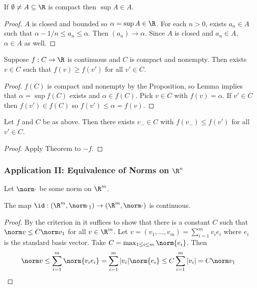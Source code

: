 \documentclass[a4paper]{article}
\theoremstyle{definition}
\begin{document}
\begin{lemma}
  If \(\emptyset \neq A \subseteq \R \) is compact then \(\sup A \in A\).
\end{lemma}

\begin{proof}
  \(A\) is closed and bounded so \(\alpha = \sup A\in \R\). For each \(n>0\), exists \(a_n \in A\) such that \(\alpha-1/n \leq a_n \leq \alpha\). Then \((a_n)\to \alpha\). Since \(A\) is closed and \(a_n \in A\), \(\alpha\in A\) as well.
\end{proof}
 
\begin{theorem}
  Suppose \(f:C\to \R\)  is continuous and \(C\) is compact and nonempty. Then exists \(v\in C\) such that \(f(v) \geq f(v')\) for all \(v' \in C\).
\end{theorem}

\begin{proof}
  \(f(C)\) is compact and nonempty by the Proposition, so Lemma implies that \(\alpha = \sup f(C)\) exists and \(\alpha\in f(C)\). Pick \(v\in C\) with \(f(v) = \alpha\). If \(v'\in C\) then \(f(v') \in f(C)\) so \(f(v') \leq \alpha = f(v)\).
\end{proof}

\begin{corollary}
  Let \(f\) and \(C\) be as above. Then there exists \(v_-\in C\) with \(f(v_-) \leq f(v')\) for all \(v' \in C\).
\end{corollary}

\begin{proof}
  Apply Theorem to \(-f\).
\end{proof}

\subsubsection{Application II: Equivalence of Norms on \texorpdfstring{\(\R^n\)}{R\^{}n}}

Let \(\norm \cdot\) be some norm on \(\R^m\).
  
\begin{lemma}
  The map \(\id: (\R^m, \norm \cdot_1) \to (\R^m, \norm \cdot)\) is continuous.
\end{lemma}

\begin{proof}
  By the criterion in  it suffices to show that there is a constant \(C\) such that \(\norm v \leq C \norm v_1\) for all \(v\in \R^m\). Let \(v = (v_1,\dots,v_m) = \sum_{i=1}^{m}v_ie_i \) where \(e_i\) is the standard basis vector. Take \(C = \max_{1\leq i\leq m}\norm{e_i}\). Then
  \[
    \norm v \leq \sum_{i=1}^{m}\norm{v_ie_i} = \sum_{i=1}^{m}|v_i| \norm{e_i} \leq C \sum_{i=1}^{m}|v_i| = C \norm v_1
  \]
\end{proof}
\end{document}

